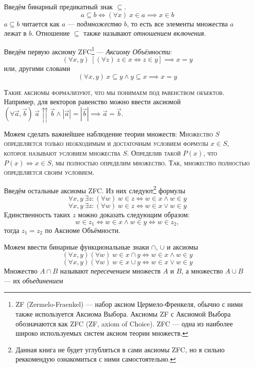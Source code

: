 Введём бинарный предикатный знак $\subseteq$.
\[
  a\subseteq b\iff (\forall x)~x\in a\implies x\in b
\]
${a\subseteq b}$ читается как $a$ --- {\it подмножество}
 $b$, то есть все
элементы множества $a$ лежат в $b$. Отношение $\subseteq$ также называют
{\it отношением включения}.

Введём первую аксиому ZFC\footnote{
  ZF (Zermelo-Fraenkel) --- набор аксиом
  Цермело-Френкеля, обычно с ними также
  используется Аксиома Выбора. Аксиомы ZF с Аксиомой Выбора
  обозначаются как ZFC (ZF, axiom of Choice).
  ZFC --- одна из наиболее широко используемых систем аксиом теории множеств.
} --- {\it Аксиому Объёмности}:
\begin{equation}\label{eq:ax_ext_1}
  (\forall x,y)~[(\forall z)~z\in x\iff z\in y]\implies x=y
\end{equation}
или, другими словами
\begin{equation}\label{eq:ax_ext_2}
  (\forall x,y)~x\subseteq y\land y\subseteq x\implies x=y
\end{equation}

\textsc{Такие аксиомы формализуют, что мы понимаем под равенством объектов.}
Например, для векторов равенство можно ввести аксиомой
$(\forall \vec{a},\vec{b})~
  \vec{a}\upuparrows\vec{b}\land|\vec{a}|=|\vec{b}|
  \implies \vec{a}=\vec{b}$.

Можем сделать важнейшее наблюдение теории множеств: \textsc{Множество $S$
  определяется только необходимым и достаточным условием формулы $x\in S$,
  которое называют условием множества $S$.
  Определив такой $P(x)$, что $P(x)\iff x\in S$, мы полностью определим множество.
  Так, множество полностью определяется своим условием.}

Введём остальные аксиомы ZFC. Из них следуют\footnote{
  Данная книга не будет углубляться в сами аксиомы ZFC, но я сильно реккомендую
  ознакомиться с ними самостоятельно.}
формулы
\[
  \forall x,y~\exists z:(\forall w)~w\in z\iff w\in x\land w\in y
\]
\[
  \forall x,y~\exists z:(\forall w)~w\in z\iff w\in x\lor w\in y
\]
Единственность таких $z$ можно доказать следующим образом:
\[
  w\in z_1\iff w\in x\land w\in y\iff w\in z_2,
\]
тогда $z_1=z_2$ по Аксиоме Объёмности.

Можем ввести бинарные функциональные знаки $\cap$, $\cup$ и аксиомы
\[
  (\forall x,y)(\forall w)~w\in x\cap y\iff w\in x\land w\in y
\]
\[
  (\forall x,y)(\forall w)~w\in x\cup y\iff w\in x\lor w\in y
\]
Множество $A\cap B$ называют {\it пересечением} множеств $A$ и $B$,
а множество $A\cup B$ --- их {\it объединением}

